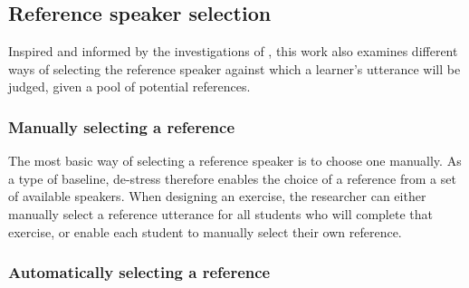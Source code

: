 	

	\subsection{Reference speaker selection}
	\label{sec:compare:selection}	
	
	Inspired and informed by the investigations of \textcite{Probst2002}, this work also examines different ways of selecting the reference speaker against which a learner's utterance will be judged, given a pool of potential references. 
	
	
		\subsubsection{Manually selecting a reference}
		\label{sec:selection:manual}
		
		The most basic way of selecting a reference speaker is to choose one manually.
As a type of baseline, de-stress therefore enables the choice of a reference from a set of available speakers.
	 When designing an exercise, the researcher can either manually select a reference utterance for all students who will complete that exercise,
	 or enable each student to manually select their own reference. 
		
	
		\subsubsection{Automatically selecting a reference}
		\label{sec:selection:auto}
		

